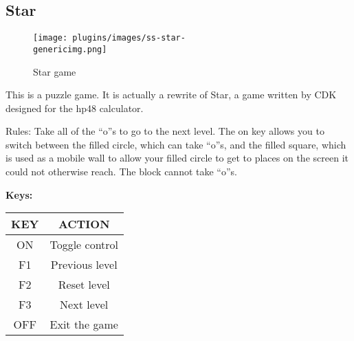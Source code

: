 \subsection{Star}
\begin{figure}[h!]
\begin{center}
\texttt{[image: plugins/images/ss-star-\\genericimg.png]}
\end{center}
\caption{Star game}
\end{figure}

This is a puzzle game.  It is actually a rewrite of Star, a game written
by CDK designed for the hp48 calculator.

Rules: Take all of the ``o''s to go to the
next level.  The on key allows you to switch between the filled circle,
which can take ``o''s, and the filled square, which is used as a mobile
wall to allow your filled circle to get to places on the screen it
could not otherwise reach. The block cannot take ``o''s.

{\bfseries
Keys:}

\begin{table}[h!]
\begin{center}
\begin{tabular}{|c|c|}
\hline
KEY & ACTION \\\hline
ON & Toggle control \\\hline
F1 & Previous level \\\hline
F2 & Reset level \\\hline
F3 & Next level \\\hline
OFF & Exit the game \\\hline
\end{tabular}
\end{center}
\end{table}


